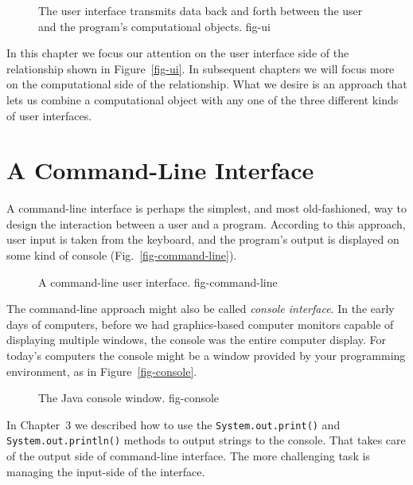 \begin{figure}[h]
{The user interface transmits data back and forth between the user
and the program's computational objects.
} {fig-ui}

\end{figure}

In this chapter we focus our attention on the user interface side of
the relationship shown in Figure~\ref{fig-ui}. In subsequent chapters
we will focus more on the computational side of the relationship. What
we desire is an approach that lets us combine a computational object
with any one of the three different kinds of user interfaces.


\section{A Command-Line Interface}
\label{a-command-line-interface}

A command-line interface is perhaps the simplest, and most
old-fashioned, way to design the interaction between a user and a
program. According to this approach, user input is taken from the
keyboard, and the program's output is displayed on some kind of
console (Fig.~\ref{fig-command-line}).

\begin{figure}[h]
{A command-line user interface.}
{fig-command-line}
\end{figure}

The command-line approach might also be called {\em console
interface}. In the early days of computers, before we had
graphics-based computer monitors capable of displaying multiple
windows, the console was the entire computer display. For today's
computers the console might be a window provided by your programming
environment, as in Figure~\ref{fig-console}.

\begin{figure}[h]
{The Java console window.
} {fig-console}

\end{figure}

In Chapter~3 we described how to use the {\tt System.out.print()} and
{\tt System.out.println()} methods to output strings to the console.
That takes care of the output side of command-line interface. The more
challenging task is managing the input-side of the interface.

